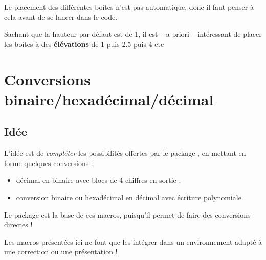 \documentclass{article}
\newcommand\ctex[1]{\tcbox[vignettelatex]{#1}}
\newcommand\Cle[1]{{\bfseries\sffamily\textlangle #1\textrangle}}
\begin{document}
\begin{codetex}[]
\begin{tikzpicture}
	\PLboitemoustaxe[min=8,max=21,affvaleurs,valeurs={8,9,...,21},elargir=0.02]
	\PLboitemoust[parametres={10/15/17/19/20},moyenne=18.5,couleur=blue]
	\PLboitemoust[elevation=2.5,parametres={8/10/11/12/15},couleur=red]
	\PLboitemoust[elevation=4,parametres={10/14/14.5/16/21},couleur=ForestGreen,remplir=ForestGreen!25]
\end{tikzpicture}
\end{codetex}

\begin{codeinfo}
Le placement des différentes boîtes n'est pas automatique, donc il faut penser à cela avant de se lancer dans le code.

Sachant que la hauteur par défaut est de 1, il est -- a priori -- intéressant de placer les boîtes à des \Cle{élévations} de \num{1} puis \num{2.5} puis \num{4} etc
\end{codeinfo}

\newpage

\section{Conversions binaire/hexadécimal/décimal}

\subsection{Idée}

\begin{codeidee}
L'idée est de \textit{compléter} les possibilités offertes par le package \ctex{xintbinhex}, en mettant en forme quelques conversions :

\begin{itemize}
	\item décimal en binaire avec blocs de 4 chiffres en sortie ;
	\item conversion binaire ou hexadécimal en décimal avec écriture polynomiale.
\end{itemize}
\end{codeidee}

\begin{codeinfo}
Le package \ctex{xintbinhex} est la base de ces macros, puisqu'il permet de faire des conversions directes !

\smallskip

Les macros présentées ici ne font que les intégrer dans un environnement adapté à une correction ou une présentation !
\end{codeinfo}
\end{document}
